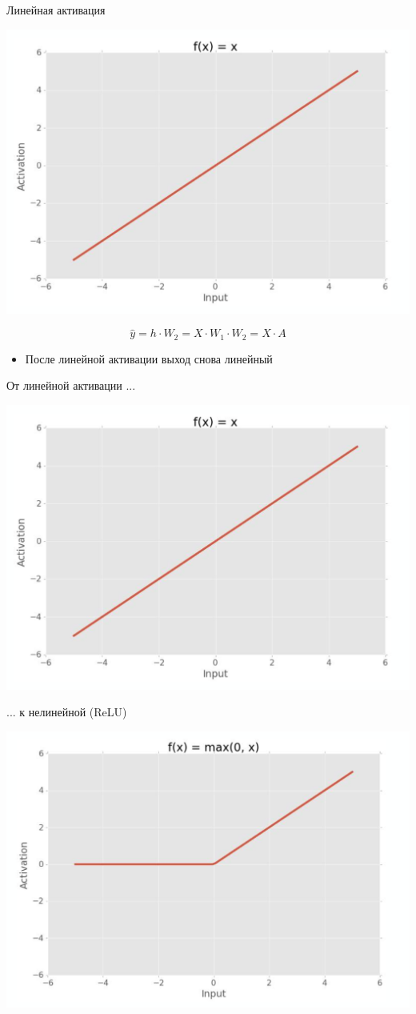 \documentclass[notes,12pt, aspectratio=169]{beamer}
\begin{document}
\begin{frame}{Линейная активация}
\begin{center}
	\includegraphics[width=.4\linewidth]{linear_activation.png}
\end{center}

\[ \hat y = h \cdot W_2 = X \cdot W_1 \cdot W_2 = X \cdot A \]

\begin{itemize}
	\item  После линейной активации выход снова линейный
\end{itemize}
\end{frame}


\begin{frame}{От линейной активации ... }
\begin{center}
	\includegraphics[width=.7\linewidth]{linear_activation.png}
\end{center}
\end{frame}


\begin{frame}{... к нелинейной (ReLU)}
\begin{center}
	\includegraphics[width=.7\linewidth]{nonlinear_activation.png}
\end{center}
\end{frame}
\end{document}
